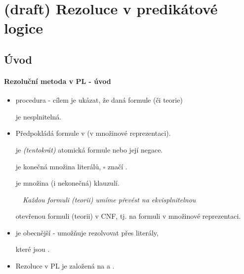 \chapter{(draft) Rezoluce v predikátové logice} 
\label{chapter:predicate-resolution}\todo




\section{Úvod}\todo


\subsubsection*{Rezoluční metoda v PL - úvod}
    
    \begin{itemize}
    \item {} procedura - cílem je ukázat, že daná formule (či teorie)
    \smallskip
    
    je nesplnitelná.
    \smallskip
    
    \item Předpokládá  formule v  (v množinové reprezentaci).
    \medskip
    
     je \emph{(tentokrát)} atomická formule nebo její negace.
    \medskip
    
     je konečná množina literálů, $\square$ značí .
    \medskip
    
     je množina (i nekonečná) klauzulí.
    \medskip
    
    {\it {}\ \ Každou formuli (teorii) umíme převést na ekvisplnitelnou
    \smallskip
    
    otevřenou formuli (teorii) v CNF, tj. na formuli v množinové reprezentaci.}
    \smallskip
    
    \item {} je obecnější - umožňuje rezolvovat přes literály,
    \smallskip
    
    které jsou .
    \smallskip
    
    \item Rezoluce v PL je založená na  a .
    \end{itemize}
    
